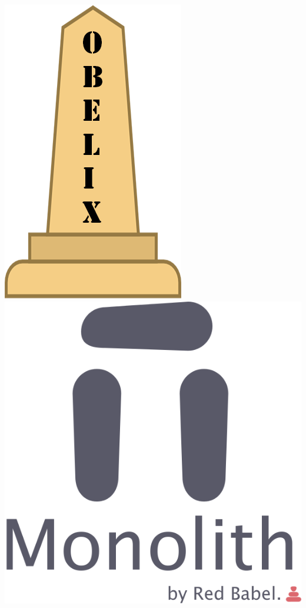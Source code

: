 \begin{frame}
	\begin{center}
		\includegraphics[scale=0.13]{img/obelix.png}
		\qquad\qquad
		\includegraphics[scale=0.13]{img/monolith.png}
	\end{center}
    \titlepage
\end{frame}


